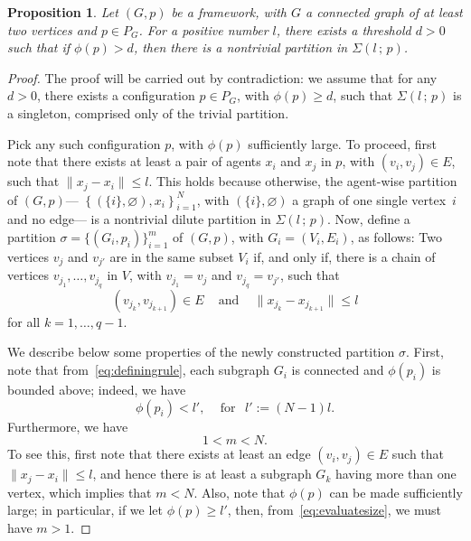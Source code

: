 \documentclass[10pt,twocolumn,twoside]{IEEEtran}
\newtheorem{pro}{Proposition}
\renewcommand{\(}{\left (}
\renewcommand{\)}{\right )}
\renewcommand{\;}{\,;\,}
\begin{document}
\begin{pro}\label{NC} Let $(G,p)$  be a framework, with $G$ a connected graph of at least two vertices and $p\in P_G$. For a positive number $l$, there exists a threshold $d>0$ such that if $\phi(p) > d$, then there is a nontrivial partition in $\Sigma(l\; p)$.
\end{pro}

\begin{proof} The proof will be carried out by contradiction: we assume that  for any $d>0$, there exists a configuration $p\in P_G$, with  $\phi(p) \ge d$, such that $\Sigma(l\; p)$ is a singleton, comprised only of the trivial partition.  

Pick any such configuration $p$, with $\phi(p)$ sufficiently large. To proceed, 
first note that there exists at least a pair of agents $x_i$ and $x_j$ in $p$, with $(v_i,v_j)\in E$, such that $\|x_j -x_i\|\le l$. This holds because otherwise,  the agent-wise partition of $(G,p)$---  
$\left\{\(\{i\}, \varnothing\), x_i\right\}^N_{i = 1}$, 
with $(\{i\}, \varnothing)$ a graph of one single vertex~$i$ and no edge---
is a nontrivial dilute partition in $\Sigma(l\; p)$.  
Now, define a partition $\sigma = \{(G_i,p_i)\}^{m}_{i=1}$ of $(G,p)$, with $G_i = (V_i,E_i)$, as follows: 
Two vertices $v_{j}$ and $v_{j'}$ are in the same subset $V_i$ if, and only if,  there is a chain of vertices $v_{j_1},\ldots,v_{j_q}$ in $V$,  with ${v_{j_1}}=v_j$ and $v_{j_q}=v_{j'}$,  such that 
\begin{equation}\label{eq:definingrule}
\(v_{j_k}, v_{j_{k+1}} \) \in E \hspace{10pt} \mbox{ and } \hspace{10pt} \| x_{j_k} - x_{j_{k+1}}\| \le l 
\end{equation}
for all $k = 1,\ldots, q-1$. 


We describe below some properties of the newly constructed partition $\sigma$. First, note that from~\eqref{eq:definingrule},  each subgraph $G_i$ is connected and $\phi(p_i)$ is bounded above; indeed, we have
\begin{equation}\label{eq:evaluatesize}
\phi(p_i)< l', \hspace{10pt} \mbox{ for } \hspace{5pt} l' := (N-1 )l.  
\end{equation} 
Furthermore, we have
\begin{equation}\label{eq:1mN}
1< m < N.
\end{equation}
To see this, first note that there exists at least an edge $(v_i,v_j)\in E$ such that $\|x_j - x_i\| \le l$, and hence there is at least a subgraph $G_k$ having more than one vertex, which implies that $m < N$. Also, note that $\phi(p)$ can be made sufficiently large; in particular, if we let $\phi(p)\ge l'$, then, from~\eqref{eq:evaluatesize}, we must have $m > 1$. 


\end{proof}
\end{document}
